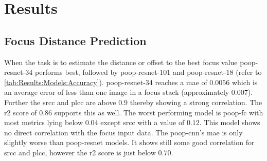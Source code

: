 \chapter{Results}
\label{ch:Results}



\section{Focus Distance Prediction}
\label{sec:Results:FocusDistance}

When the task is to estimate the distance or offset to the best focus value \acs{poop}-\acs{resnet}-34 performs best, followed by \acs{poop}-\acs{resnet}-101 and \acs{poop}-\acs{resnet}-18 (refer to \autoref{tab:Results:Models:Accuracy}). \Acs{poop}-\acs{resnet}-34 reaches a \ac{mae} of $0.0056$ which is an average error of less than one image in a focus stack (approximately $0.007$). Further the \ac{srcc} and \ac{plcc} are above $0.9$ thereby showing a strong correlation. The \ac{r2} score of $0.86$ supports this as well.
The worst performing model is \acs{poop}-\acs{fc} with most metrics lying below $0.04$ except \ac{srcc} with a value of $0.12$. This model shows no direct correlation with the focus input data. The \acs{poop}-\acs{cnn}'s \ac{mae} is only slightly worse than \acs{poop}-\acs{resnet} models. It shows still some good correlation for \ac{srcc} and \ac{plcc}, however the \ac{r2} score is just below $0.70$. 

